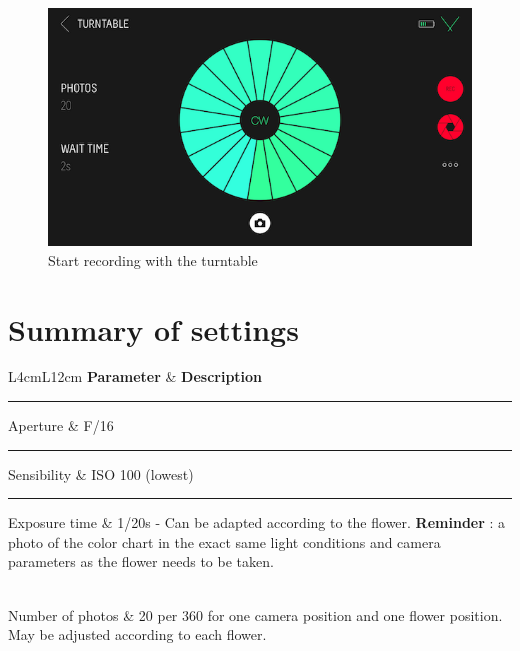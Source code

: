 \documentclass[
]{book}
\theoremstyle{definition}
\theoremstyle{definition}
\theoremstyle{definition}
\theoremstyle{definition}
\theoremstyle{remark}
\begin{document}
\begin{figure}
\hypertarget{record}{%
\centering
\includegraphics{Figures/genie_turntable_20_1.PNG}
\caption{Start recording with the
turntable}\label{record}
}
\end{figure}

\hypertarget{summary-of-settings}{%
\section{Summary of settings}\label{summary-of-settings}}

L4cm\textbar L12cm \textbf{Parameter} \& \textbf{Description}\\

\begin{center}\rule{0.5\linewidth}{0.5pt}\end{center}

\hfill\break
Aperture \& F/16\\

\begin{center}\rule{0.5\linewidth}{0.5pt}\end{center}

Sensibility \& ISO 100 (lowest)\\

\begin{center}\rule{0.5\linewidth}{0.5pt}\end{center}

Exposure time \& 1/20s - Can be adapted according to the flower.
\textbf{Reminder} : a photo of the color chart in the exact same light
conditions and camera parameters as the flower needs to be taken.\\
\strut \\
Number of photos \& 20 per 360 for one camera position and one flower
position. May be adjusted according to each flower.\\
\end{document}
